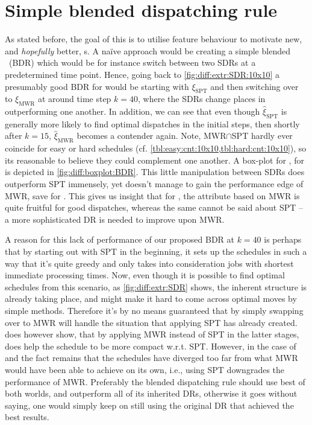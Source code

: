\section{Simple blended dispatching rule}\label{sec:diff:opt:bdr}
As stated before, the goal of this  is to 
utilise feature behaviour to motivate new, and \emph{hopefully} better, 
\dr s. 
A na\"ive approach would be creating a simple blended \dr\ (BDR) which 
would be for instance switch between two SDRs at a predetermined time point. 
Hence, going back to \cref{fig:diff:extr:SDR:10x10} a presumably good BDR for 
  would be starting with ${\xi}_{\text{SPT}}$ and then switching 
over to ${\xi}_{\text{MWR}}$ at around time step $k=40$, where the SDRs change 
places in outperforming one another. 
In addition, we can see that even though $\hat{\xi}_{\text{SPT}}$ is generally 
more likely to find optimal dispatches in the initial steps, then shortly after 
$k=15$, $\hat{\xi}_{\text{MWR}}$ becomes a contender again. 
Note, MWR$\cap$SPT hardly ever coincide for easy or hard schedules (cf. 
\cref{tbl:easy:cnt:10x10,tbl:hard:cnt:10x10}), so its reasonable to believe 
they could complement one another.
A box-plot for \namerho, for  is 
depicted in \cref{fig:diff:boxplot:BDR}. This little manipulation between SDRs 
does outperform SPT immensely, yet doesn't manage to gain the performance edge 
of MWR, save for . This gives us insight that for \jsp, the 
attribute based on MWR is quite fruitful for good dispatches, whereas the same 
cannot be said about SPT -- a more sophisticated DR is needed to improve upon 
MWR. 

A reason for this lack of performance of our proposed BDR at $k=40$ is perhaps 
that by starting out with SPT in the beginning, 
it sets up the schedules in such a way 
that it's quite greedy and only takes into consideration jobs with shortest 
immediate processing times. Now, even though it is possible to find optimal 
schedules from this scenario, as \cref{fig:diff:extr:SDR} shows, the inherent 
structure is already taking place, and might make it hard to come across 
optimal moves by simple methods. Therefore it's by no means guaranteed that by 
simply swapping over to MWR will handle the situation that applying SPT has 
already created.  does however show, that by 
applying MWR instead of SPT in the latter stages, does help the schedule to be 
more compact w.r.t. SPT. However, in the case of  and 
 the fact remains that the schedules have diverged too far from 
what MWR would have been able to achieve on its own, i.e., using SPT 
downgrades the performance of MWR. 
Preferably the blended dispatching rule should use  best of both worlds, and 
outperform all of its inherited DRs, otherwise it goes without saying, one 
would simply keep on still using the original DR that achieved the best results.

